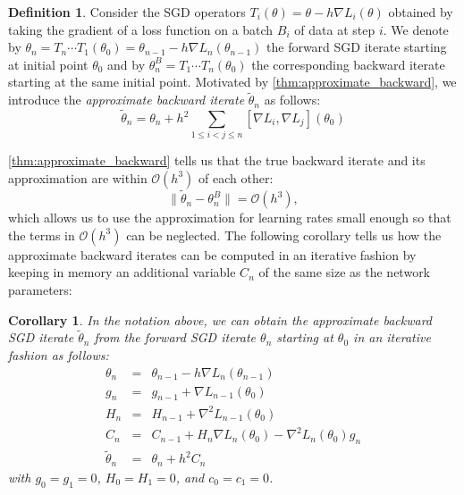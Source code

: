 \documentclass[10pt]{article} %
\theoremstyle{plain}
\newtheorem{corollary}[theorem]{Corollary}
\theoremstyle{definition}
\newtheorem{definition}[theorem]{Definition}
\theoremstyle{remark}
\begin{document}
\begin{definition}\label{definition:backward_iterate}
Consider the SGD operators $T_i(\theta) = \theta - h \nabla L_i(\theta)$ obtained by taking the gradient of a loss function on a batch $B_i$ of data at step $i$. We denote by $\theta_n = T_n\cdots T_1(\theta_0) = \theta_{n-1} - h \nabla L_n(\theta_{n-1})$ the forward SGD iterate starting at initial point $\theta_0$ and by $\theta_n^B = T_1\cdots T_n(\theta_0)$ the corresponding backward iterate starting at the same initial point. Motivated by \cref{thm:approximate_backward}, we introduce the {\emph{approximate backward iterate}} $\tilde \theta_n$ as follows:
\begin{equation}
    \tilde \theta_n = \theta_n + h^2 \sum_{1\leq i<j\leq n} [\nabla L_i, \nabla L_j] (\theta_0)
\end{equation}
\end{definition}

\cref{thm:approximate_backward} tells us that the true backward iterate and its approximation are within $\mathcal O(h^3)$ of each other:
\begin{equation}
    \|\tilde \theta_n - \theta_n^B\| = \mathcal O (h^3),
\end{equation}
which allows us to use the approximation for learning rates small enough so that the terms in $\mathcal O(h^3)$ can be neglected. The following corollary tells us how the approximate backward iterates can be computed in an iterative fashion by keeping in memory an additional variable $C_n$ of the same size as the network parameters:

\begin{corollary} \label{corollary:approximation}
In the notation above, we can obtain the approximate backward SGD iterate $\tilde \theta_n$ from the forward SGD iterate $\theta_n$ starting at $\theta_0$ in an iterative fashion as follows:
\begin{eqnarray*}
    \theta_n & = & \theta_{n-1} - h \nabla L_{n}(\theta_{n-1}) \\
    g_n & = & g_{n-1} + \nabla L_{n-1}(\theta_0) \\
    H_n & = & H_{n-1} + \nabla^2 L_{n-1}(\theta_0) \\
    C_n      & = & C_{n-1} + H_n \nabla L_{n}(\theta_0) - \nabla^2 L_{n}(\theta_0) g_n \\
    \tilde \theta_n & = & \theta_n + h^2 C_n
\end{eqnarray*}
with $g_0 = g_1 = 0$,  $H_0 = H_1 = 0$, and $c_0 = c_1 =0$.
\end{corollary}
\end{document}
